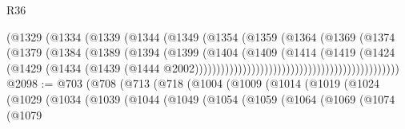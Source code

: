\begin{lexlean}{R36}
\begin{coremodule}
                                                  (@1329
                                                    (@1334
                                                      (@1339
                                                        (@1344
                                                          (@1349
                                                            (@1354
                                                              (@1359
                                                                (@1364
                                                                  (@1369
                                                                    (@1374
                                                                      (@1379
                                                                        (@1384
                                                                          (@1389
                                                                            (@1394
                                                                              (@1399
                                                                                (@1404
                                                                                  (@1409
                                                                                    (@1414
                                                                                      (@1419
                                                                                        (@1424
                                                                                          (@1429
                                                                                            (@1434
                                                                                              (@1439
                                                                                                (@1444
                                                                                                  @2002)))))))))))))))))))))))))))))))))))))))))))))))
@2098 := @703
    (@708
      (@713
        (@718
          (@1004
            (@1009
              (@1014
                (@1019
                  (@1024
                    (@1029
                      (@1034
                        (@1039
                          (@1044
                            (@1049
                              (@1054
                                (@1059
                                  (@1064
                                    (@1069
                                      (@1074
                                        (@1079

\end{coremodule}
\end{lexlean}

